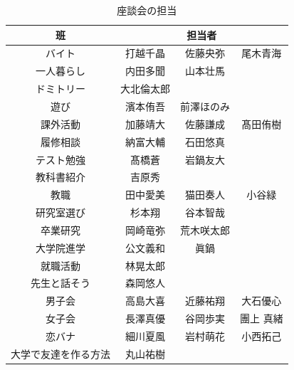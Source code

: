 \begin{table}[h]
  \centering
  \caption{座談会の担当}
  \begin{tabular}{cccc}
    \hline
    班 & \multicolumn{3}{c}{担当者} \\
    \hline
    バイト & 打越千晶 & 佐藤央弥 & 尾木青海 \\
    一人暮らし & 内田多聞 & 山本壮馬 & \\
    ドミトリー & 大北倫太郎 & & \\
    遊び & 濱本侑吾 & 前澤ほのみ &  \\
    課外活動 & 加藤靖大 & 佐藤謙成 & 髙田侑樹 \\ 
    \hline
    履修相談 & 納富大輔 & 石田悠真 &  \\
    テスト勉強 & 髙橋蒼 & 岩鍋友大 &  \\
    教科書紹介 & 吉原秀 &  &  \\
    教職 & 田中愛美 & 猫田奏人 & 小谷緑 \\
    \hline
    研究室選び & 杉本翔 & 谷本智哉 &  \\
    卒業研究 & 岡崎竜弥 & 荒木咲太郎 &  \\
    大学院進学 & 公文義和 & 眞鍋 &  \\
    就職活動 & 林晃太郎 &  &  \\
    \hline
    先生と話そう & 森岡悠人 &  &  \\
    \hline
    男子会 & 高島大喜 & 近藤祐翔 & 大石優心 \\
    女子会 & 長澤真優 & 谷岡歩実 & 團上 真緒 \\
    恋バナ & 細川夏風 & 岩村萌花 & 小西拓己 \\
    大学で友達を作る方法 & 丸山祐樹 &  &  \\
    \hline
  \end{tabular}
\end{table}

